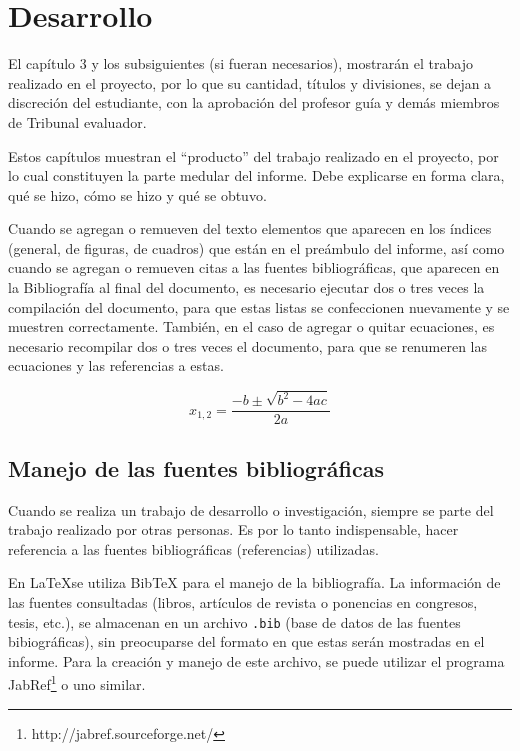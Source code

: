   \chapter{Desarrollo}
\label{C:desarrollo}

El capítulo 3 y los subsiguientes (si fueran necesarios), mostrarán el trabajo realizado en el proyecto, por lo que su cantidad, títulos y divisiones, se dejan a discreción del estudiante, con la aprobación del profesor guía y demás miembros de Tribunal evaluador.

Estos capítulos muestran el ``producto'' del trabajo realizado en el proyecto, por lo cual constituyen la parte medular del informe. Debe explicarse en forma clara, qué se hizo, cómo se hizo y qué se obtuvo.

Cuando se agregan o remueven del texto elementos que aparecen en los índices (general, de figuras, de cuadros) que están en el preámbulo del informe, así como cuando se agregan o remueven citas a las fuentes bibliográficas, que aparecen en la Bibliografía al final del documento, es necesario ejecutar dos o tres veces la compilación del documento, para que estas listas se confeccionen nuevamente y se muestren correctamente.  También, en el caso de agregar o quitar ecuaciones, es necesario recompilar dos o tres veces el documento, para que se renumeren las ecuaciones y  las referencias a estas.

\begin{equation}
x_{1,2} = \frac{-b \pm \sqrt{b^2 - 4ac}}{2a}
\end{equation}

\section{Manejo de las fuentes bibliográficas}
Cuando se realiza un trabajo de desarrollo o investigación, siempre se parte del trabajo realizado por otras personas. Es por lo tanto indispensable, hacer referencia a las fuentes bibliográficas (referencias) utilizadas.

En \LaTeX se utiliza BibTeX para el manejo de la bibliografía.  La información de las fuentes consultadas (libros, artículos de revista o ponencias en congresos, tesis, etc.), se almacenan en un archivo \texttt{.bib} (base de datos de las fuentes bibiográficas), sin preocuparse del formato en que estas serán mostradas en el informe.  Para la creación y manejo de este archivo, se puede utilizar el programa JabRef\footnote{http://jabref.sourceforge.net/} o uno similar.

